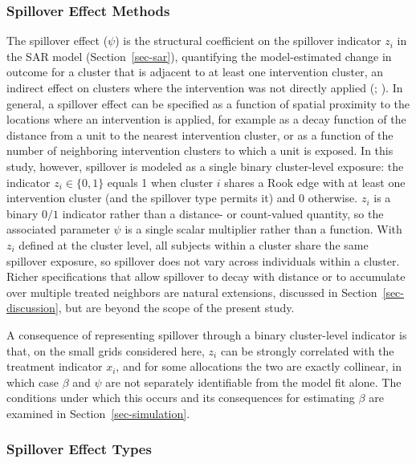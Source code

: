 \documentclass[
  12pt,
  prelim]{bios-prelim}
\begin{document}
\subsubsection{Spillover Effect
Methods}\label{sec-spillover-effect-methods}

The spillover effect (\(\psi\)) is the structural coefficient on the
spillover indicator \(z_i\) in the SAR model (Section~\ref{sec-sar}),
quantifying the model-estimated change in outcome for a cluster that is
adjacent to at least one intervention cluster, an indirect effect on
clusters where the intervention was not directly applied
(; ). In general, a spillover effect can be specified as a
function of spatial proximity to the locations where an intervention is
applied, for example as a decay function of the distance from a unit to
the nearest intervention cluster, or as a function of the number of
neighboring intervention clusters to which a unit is exposed. In this
study, however, spillover is modeled as a single binary cluster-level
exposure: the indicator \(z_i \in
\{0,1\}\) equals 1 when cluster \(i\) shares a Rook edge with at least
one intervention cluster (and the spillover type permits it) and 0
otherwise. \(z_i\) is a binary \(0/1\) indicator rather than a distance-
or count-valued quantity, so the associated parameter \(\psi\) is a
single scalar multiplier rather than a function. With \(z_i\) defined at
the cluster level, all subjects within a cluster share the same
spillover exposure, so spillover does not vary across individuals within
a cluster. Richer specifications that allow spillover to decay with
distance or to accumulate over multiple treated neighbors are natural
extensions, discussed in Section~\ref{sec-discussion}, but are beyond
the scope of the present study.

A consequence of representing spillover through a binary cluster-level
indicator is that, on the small grids considered here, \(z_i\) can be
strongly correlated with the treatment indicator \(x_i\), and for some
allocations the two are exactly collinear, in which case \(\beta\) and
\(\psi\) are not separately identifiable from the model fit alone. The
conditions under which this occurs and its consequences for estimating
\(\beta\) are examined in Section~\ref{sec-simulation}.

\subsubsection{Spillover Effect Types}\label{sec-spillover-effect-types}
\end{document}
